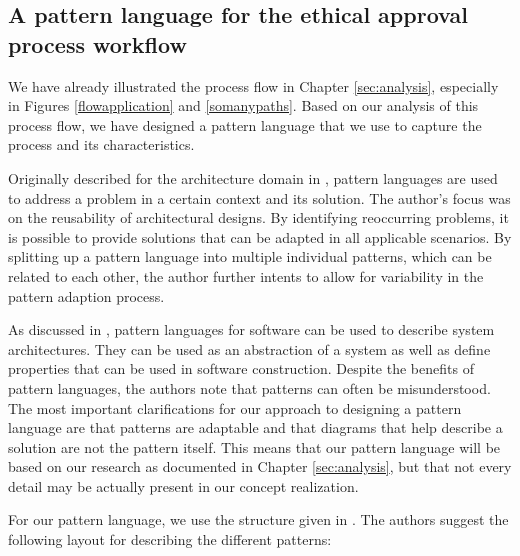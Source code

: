 \documentclass[10pt]{article}
\begin{document}
\subsection{A pattern language for the ethical approval process workflow}
 We have already illustrated the process flow in Chapter \ref{sec:analysis}, especially in Figures \ref{flowapplication} and \ref{somanypaths}. Based on our analysis of this process flow, we have designed a pattern language that we use to capture the process and its characteristics.

Originally described for the architecture domain in \cite{alexanderpatterns}, pattern languages are used to address a problem in a certain context and its solution. The author's focus was on the reusability of architectural designs. By identifying reoccurring problems, it is possible to provide solutions that can be adapted in all applicable scenarios. By splitting up a pattern language into multiple individual patterns, which can be related to each other, the author further intents to allow for variability in the pattern adaption process.

As discussed in \cite{buschmannpatterns}, pattern languages for software can be used to describe system architectures. They can be used as an abstraction of a system as well as define properties that can be used in software construction. Despite the benefits of pattern languages, the authors note that patterns can often be misunderstood. The most important clarifications for our approach to designing a pattern language are that patterns are adaptable and that diagrams that help describe a solution are not the pattern itself. This means that our pattern language will be based on our research as documented in Chapter \ref{sec:analysis}, but that not every detail may be actually present in our concept realization. 

For our pattern language, we use the structure given in \cite{patternlanguage}. The authors suggest the following layout for describing the different patterns:
\end{document}
